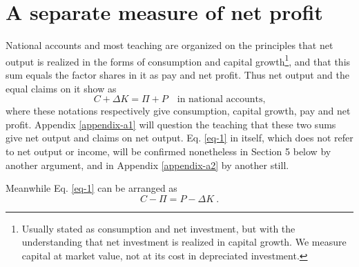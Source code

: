 \documentclass[a4paper,fleqn]{cas-sc}
\begin{document}
\section{A separate measure of net profit}

National accounts and most teaching are organized on the principles that net output is realized in the forms of consumption and capital growth\footnote{Usually stated as consumption and net investment, but with the understanding that net investment is realized in capital growth. We measure capital at market value, not at its cost in depreciated investment.}, and that this sum equals the factor shares in it as pay and net profit. Thus net output and the equal claims on it show as
\begin{equation}
    C + \Delta K = \Pi + P \quad \text{in national accounts,} \label{eq-1}
\end{equation}
where these notations respectively give consumption, capital growth, pay and net profit. Appendix \ref{appendix-a1} will question the teaching that these two sums give net output and claims on net output. Eq. \eqref{eq-1} in itself, which does not refer to net output or income, will be confirmed nonetheless in Section 5 below by another argument, and in Appendix \ref{appendix-a2} by another still.

Meanwhile Eq. \eqref{eq-1} can be arranged as
\begin{equation}
    C - \Pi = P - \Delta K \ . \label{eq-2}
\end{equation}
\end{document}
